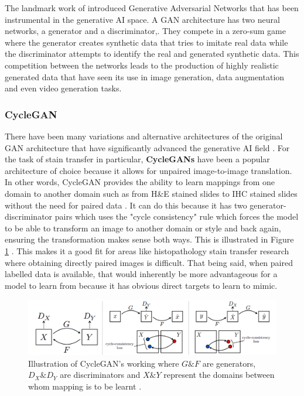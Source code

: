 The landmark work of  \textcite{Goodfellow2014GenerativeNetworks}  introduced Generative Adversarial Networks that has been instrumental in the generative AI space. A GAN architecture has two neural networks, a generator and a discriminator,. They compete in a zero-sum game where the generator creates synthetic data that tries to imitate real data while the discriminator attempts to identify the real and generated synthetic data. This competition between the networks leads to the production of highly realistic generated data that have seen its use in image generation, data augmentation and even video generation tasks. 

\subsubsection{CycleGAN}

There have been many variations and alternative architectures of the original GAN architecture that have significantly advanced the generative AI field \parencite{Goodfellow2020GenerativeNetworks}. For the task of stain transfer in particular, \textbf{CycleGANs} have been a popular architecture of choice because it allows for unpaired image-to-image translation. In other words, CycleGAN provides the ability to learn mappings from one domain to another domain such as from H\&E stained slides to IHC stained slides without the need for paired data \parencite{Zhu2017UnpairedNetworks}. It can do this because it has two generator-discriminator pairs which uses the "cycle consistency" rule which forces the model to be able to transform an image to another domain or style and back again, ensuring the transformation makes sense both ways. This is illustrated in Figure \ref{fig:CycleGAN} . This makes it a good fit for areas like histopathology stain transfer research where obtaining directly paired images is difficult. That being said, when paired labelled data is available, that would inherently be more advantageous for a model to learn from because it has obvious direct targets to learn to mimic.

\begin{figure}[h]
    \centering
    \includegraphics[width=1.0\linewidth]{2_LiteratureSurvey/figures/CycleGAN.png}
    \caption[CycleGAN workflow]{Illustration of CycleGAN's working where $G \& F$ are generators, $D_{X} \& D_{Y}$ are discriminators and $X \& Y$ represent the domains between whom mapping is to be learnt \parencite[Figure 3, p. 2244]{Zhu2017UnpairedNetworks}.}
    \label{fig:CycleGAN}
\end{figure}

